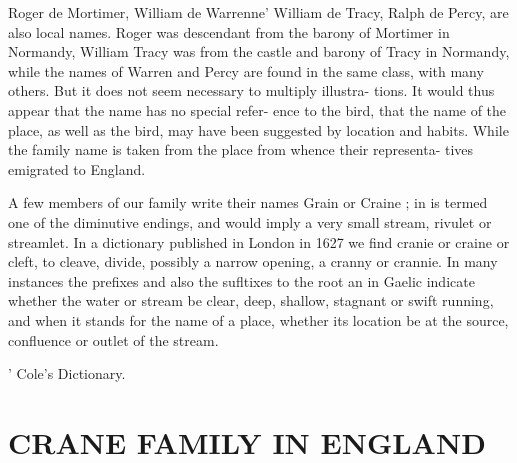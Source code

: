 \documentclass{book}
\begin{document}
Roger de Mortimer, William de Warrenne' William de Tracy, 
Ralph de Percy, are also local names. Roger was descendant 
from the barony of Mortimer in Normandy, William Tracy was 
from the castle and barony of Tracy in Normandy, while the 
names of Warren and Percy are found in the same class, with 
many others. But it does not seem necessary to multiply illustra- 
tions. It would thus appear that the name has no special refer- 
ence to the bird, that the name of the place, as well as the bird, 
may have been suggested by location and habits. While the 
family name is taken from the place from whence their representa- 
tives emigrated to England. 

A few members of our family write their names Grain or 
Craine ; in is termed one of the diminutive endings, and would 
imply a very small stream, rivulet or streamlet. In a dictionary 
published in London in 1627 we find cranie or craine or cleft, 
to cleave, divide, possibly a narrow opening, a cranny or crannie. 
In many instances the prefixes and also the sufltixes to the root 
an in Gaelic indicate whether the water or stream be clear, deep, 
shallow, stagnant or swift running, and when it stands for the 
name of a place, whether its location be at the source, confluence 
or outlet of the stream. 



' Cole's Dictionary. 



\chapter{CRANE FAMILY IN ENGLAND}
\end{document}
